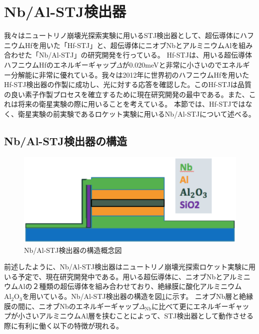\section{Nb/Al-STJ検出器}
	我々はニュートリノ崩壊光探索実験に用いるSTJ検出器として、超伝導体にハフニウムHfを用いた「Hf-STJ」と、超伝導体にニオブNbとアルミニウムAlを組み合わせた「Nb/Al-STJ」の研究開発を行っている。
	Hf-STJは、用いる超伝導体ハフニウムHfのエネルギーギャップ$\Delta$が0.020meVと非常に小さいのでエネルギー分解能に非常に優れている。我々は2012年に世界初のハフニウムHfを用いたHf-STJ検出器の作製に成功し、光に対する応答を確認した。このHf-STJは品質の良い素子作製プロセスを確立するために現在研究開発の最中である。また、これは将来の衛星実験の際に用いることを考えている。
	本節では、Hf-STJではなく、衛星実験の前実験であるロケット実験に用いるNb/Al-STJについて述べる。
	\subsection{Nb/Al-STJ検出器の構造}
		\begin{figure}[htbp]
  			\begin{center}
    				\includegraphics[width=12.0cm]{./Chapter/Chapter2/Picture/NbAlSTJ_structure.eps}
    				\caption{Nb/Al-STJ検出器の構造概念図}
	  			\label{fig:NbAlSTJ_structure}
  			\end{center}
		\end{figure}
		前述したように、Nb/Al-STJ検出器はニュートリノ崩壊光探索ロケット実験に用いる予定で、現在研究開発中である。用いる超伝導体に、ニオブNbとアルミニウムAlの２種類の超伝導体を組み合わせており、絶縁膜に酸化アルミニウム$\mathrm{Al_{2}O_3}$を用いている。Nb/Al-STJ検出器の構造を図\ref{fig:NbAlSTJ_structure}に示す。
		ニオブNb層と絶縁膜の間に、ニオブNbのエネルギーギャップ$\Delta_{\mathrm{Nb}}$に比べて更にエネルギーギャップが小さいアルミニウムAl層を挟むことによって、STJ検出器として動作させる際に有利に働く以下の特徴が現れる。
